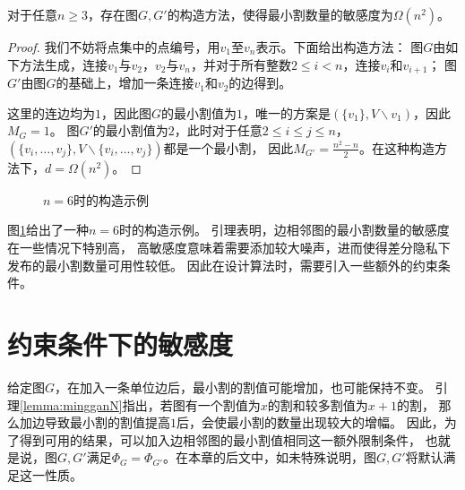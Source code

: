 \begin{lemma}
  \label{lemma:mingganN}
  对于任意$n\geq 3$，存在图$G,G'$的构造方法，使得最小割数量的敏感度为$\Omega(n^2)$。
\end{lemma}
\begin{proof}
  我们不妨将点集中的点编号，用$v_1$至$v_n$表示。下面给出构造方法：
  图$G$由如下方法生成，连接$v_1$与$v_2$，$v_2$与$v_n$，并对于所有整数$2\leq i<n$，连接$v_i$和$v_{i+1}$；
  图$G'$由图$G$的基础上，增加一条连接$v_1$和$v_2$的边得到。
  
  这里的连边均为$1$，因此图$G$的最小割值为$1$，唯一的方案是$(\{v_1\},V\backslash v_1)$，因此$M_G=1$。
  图$G'$的最小割值为$2$，此时对于任意$2\leq i\leq j\leq n$，
  $(\{v_i,\ldots,v_j\},V\backslash \{v_i,\ldots,v_j\})$都是一个最小割，
  因此$M_{G'}=\frac{n^2-n}2$。在这种构造方法下，$d=\Omega(n^2)$。
\end{proof}
\begin{figure}[htb]
    \centering
    \hspace{4em}
    \caption{$n=6$时的构造示例}
    \label{fig:exA}
\end{figure}
图\ref{fig:exA}给出了一种$n=6$时的构造示例。
引理表明，边相邻图的最小割数量的敏感度在一些情况下特别高，
高敏感度意味着需要添加较大噪声，进而使得差分隐私下发布的最小割数量可用性较低。
因此在设计算法时，需要引入一些额外的约束条件。
\section{约束条件下的敏感度}
给定图$G$，在加入一条单位边后，最小割的割值可能增加，也可能保持不变。
引理\ref{lemma:mingganN}指出，若图有一个割值为$x$的割和较多割值为$x+1$的割，
那么加边导致最小割的割值提高$1$后，会使最小割的数量出现较大的增幅。
因此，为了得到可用的结果，可以加入边相邻图的最小割值相同这一额外限制条件，
也就是说，图$G,G'$满足$\Phi_G=\Phi_{G'}$。在本章的后文中，如未特殊说明，图$G,G'$将默认满足这一性质。


